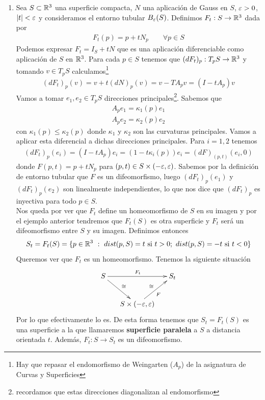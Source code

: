 \begin{ejemplo}
\begin{enumerate}
        \item Sea $S\subset \mathbb{R}^3$ una superficie compacta, $N$ una aplicación de Gauss en $S$, $\varepsilon>0$, $|t|<\varepsilon$ y consideramos el entorno tubular $B_\varepsilon(S)$. Definimos $F_t: S \to \mathbb{R}^3$ dada por 
        \begin{gather*}
            F_t(p) = p + tN_p \qquad \forall p \in S
        \end{gather*}
        Podemos expresar $F_t = I_S + tN$ que es una aplicación diferenciable como aplicación de $S$ en $\mathbb{R}^3$. Para cada $p\in S$ tenemos que $(dF_t)_p : T_pS \to \mathbb{R}^3$ y tomando $v\in T_pS$ calculamos\footnote{Hay que repasar el endomorfismo de Weingarten ($A_p$) de la asignatura de Curvas y Superficies}
        \begin{gather*}
            (dF_t)_p(v) = v + t(dN)_p(v) = v - TA_p v = (I-tA_p)v
        \end{gather*}
        Vamos a tomar $e_1, e_2\in T_pS$ direcciones principales\footnote{recordamos que estas direcciones diagonalizan al endomorfismo}. Sabemos que 
        \begin{gather*}
            A_pe_1 = \kappa_1(p)e_1\\
            A_pe_2 = \kappa_2(p)e_2
        \end{gather*}
        con $\kappa_1(p)\leq \kappa_2(p)$ donde $\kappa_1$ y $\kappa_2$ son las curvaturas principales. Vamos a aplicar esta diferencial a dichas direcciones principales. Para $i=1,2$ tenemos
        \begin{gather*}
            (dF_t)_p(e_i) = (I-tA_p)e_i = (1-t\kappa_i(p))e_i = (dF)_(p,t)(e_i, 0)
        \end{gather*}
        donde $F(p,t) = p+tN_p$ para $(p,t)\in S\times(-\varepsilon, \varepsilon)$. Sabemos por la definición de entorno tubular que $F$ es un difeomorfismo, luego $(dF_t)_p(e_1)$ y $(dF_t)_p(e_2)$ son linealmente independientes, lo que nos dice que $(dF_t)_p$ es inyectiva para todo $p\in S$.\\

        Nos queda por ver que $F_t$ define un homeomorfismo de $S$ en su imagen y por el ejemplo anterior tendremos que $F_t(S)$ es otra superficie y $F_t$ será un difeomorfismo entre $S$ y su imagen. Definimos entonces
        \begin{gather*}
            S_t = F_t(S) = \{p\in \mathbb{R}^3 \ : \ dist(p,S)=t \text{ si }t>0;\ dist(p,S)=-t \text{ si }t<0\}
        \end{gather*}
        Queremos ver que $F_t$ es un homeomorfismo. Tenemos la siguiente situación
        \begin{gather*}
            \xymatrix@C=5mm{
                S \ar[rr]^{F_t} \ar[rd]^{\cong} & & S_t\\
                & S\times(-\veps, \veps) \ar[ur]_{F}^{\cong}
            }
        \end{gather*}
        Por lo que efectivamente lo es. De esta forma tenemos que $S_t=F_t(S)$ es una superficie a la que llamaremos \textbf{superficie paralela} a $S$ a distancia orientada $t$. Además, $F_t: S \to S_t$ es un difeomorfismo.\\


\end{enumerate}
\end{ejemplo}

